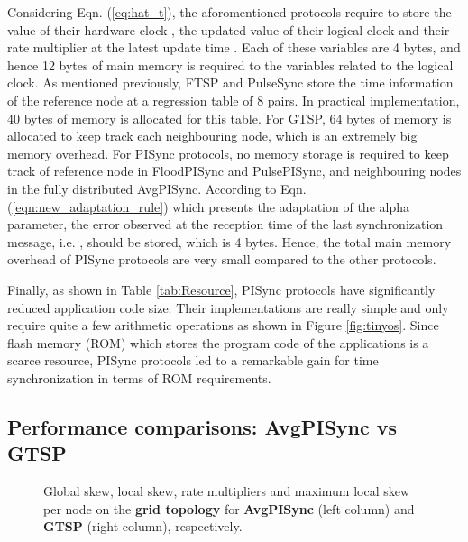 \documentclass[english,a4paper,10pt,final]{article}
\numberwithin{equation}{section}
\numberwithin{figure}{section}
\begin{document}
Considering Eqn. (\ref{eq:hat_t}), the aforomentioned protocols require to store the value of their hardware clock , the updated value of their logical clock  and their rate multiplier  at the latest update time . Each of these variables are 4 bytes, and hence 12 bytes of main memory is required to the variables related to the logical clock. As mentioned previously, FTSP and PulseSync store the time information of the reference node at a regression table of 8 pairs. In practical implementation, 40 bytes of memory is allocated for this table. For GTSP, 64 bytes of memory is allocated to keep track each neighbouring node, which is an extremely big memory overhead. For PISync protocols, no memory storage is required to keep track of reference node in FloodPISync and PulsePISync,  and neighbouring nodes in the fully distributed AvgPISync. According to Eqn. (\ref{eqn:new_adaptation_rule}) which presents the adaptation of the alpha parameter, the error observed at the reception time of the last synchronization message, i.e. , should be stored, which is 4 bytes. Hence, the total main memory overhead of PISync protocols are very small compared to the other protocols.


Finally, as shown in Table \ref{tab:Resource}, PISync protocols have significantly reduced application code size. Their implementations are really simple and only require quite a few arithmetic operations as shown in Figure \ref{fig:tinyos}. Since flash memory (ROM) which stores the program code of the applications is a scarce resource, PISync protocols led to a remarkable gain for time synchronization in terms of ROM requirements. 






\subsection{ Performance comparisons: AvgPISync vs GTSP}\label{subsec:AvgPISync-GTSP}

\begin{figure*}

\center





\caption{\label{fig:pi-gtsp-grid} Global skew, local skew, rate multipliers and maximum local skew per node on the {\bf grid topology} for \textbf{AvgPISync} (left column) and \textbf{GTSP} (right column), respectively.}
\end{figure*}
\end{document}
